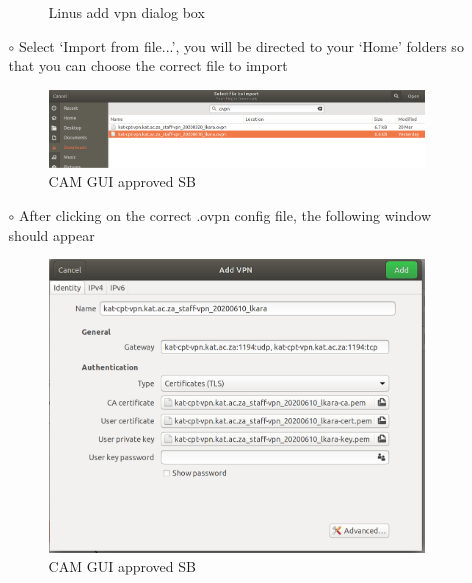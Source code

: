 \begin{itemize}
\begin{itemize}
\begin{figure}[!thb]
	\caption{Linus add vpn dialog box}
	\label{fig:image2}
\end{figure}

\item[$\circ$] Select ‘Import from file...’, you will be directed to your ‘Home’ folders so that you can choose the correct file to import
\begin{figure}[!thb]
	\centering
	\includegraphics[scale=0.23]{Chapters/images/image130.png}
	
	\caption{CAM GUI approved SB }
	\label{fig:image130}
\end{figure}


\item[$\circ$] After clicking on the correct .ovpn config file, the following window should appear

\begin{figure}[!thb]
	\centering
	\includegraphics[scale=0.25]{Chapters/images/image112.png}
	
	\caption{CAM GUI approved SB }
	\label{fig:image112}
\end{figure}


\end{itemize}
\end{itemize}
